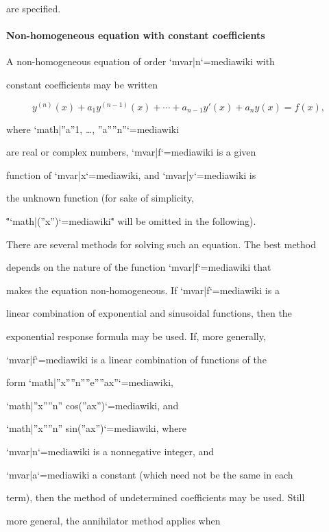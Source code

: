are specified.



\paragraph{Non-homogeneous equation with constant coefficients}



A non-homogeneous equation of order `{{mvar|n}}`{=mediawiki} with

constant coefficients may be written



$$y^{(n)}(x) + a_1 y^{(n-1)}(x) + \cdots + a_{n-1} y'(x)+ a_ny(x) = f(x),$$

where `{{math|''a''1, …, ''a''''n''}}`{=mediawiki}

are real or complex numbers, `{{mvar|f}}`{=mediawiki} is a given

function of `{{mvar|x}}`{=mediawiki}, and `{{mvar|y}}`{=mediawiki} is

the unknown function (for sake of simplicity,

\""`{{math|(''x'')}}`{=mediawiki}\"" will be omitted in the following).



There are several methods for solving such an equation. The best method

depends on the nature of the function `{{mvar|f}}`{=mediawiki} that

makes the equation non-homogeneous. If `{{mvar|f}}`{=mediawiki} is a

linear combination of exponential and sinusoidal functions, then the

exponential response formula may be used. If, more generally,

`{{mvar|f}}`{=mediawiki} is a linear combination of functions of the

form `{{math|''x''''n''''e''''ax''}}`{=mediawiki},

`{{math|''x''''n'' cos(''ax'')}}`{=mediawiki}, and

`{{math|''x''''n'' sin(''ax'')}}`{=mediawiki}, where

`{{mvar|n}}`{=mediawiki} is a nonnegative integer, and

`{{mvar|a}}`{=mediawiki} a constant (which need not be the same in each

term), then the method of undetermined coefficients may be used. Still

more general, the annihilator method applies when

